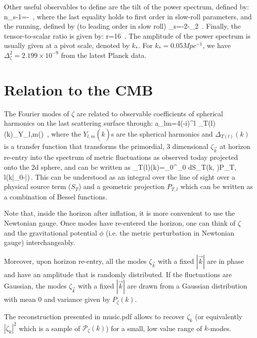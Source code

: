 \documentclass[useAMS,usenatbib,a4paper,onecolumn]{mn2e}
\begin{document}
Other useful observables to define are the tilt of the power spectrum, defined by:
\be
	n_s-1\equiv{}=-\eta\, ,
\ee
where the last equality holds to first order in slow-roll parameters, and the running, defined by (to leading order in slow roll)
\be
	\alpha_s=-2\eta\epsilon-\eta\eta_2\, .
\ee
Finally, the tensor-to-scalar ratio is given by:
\be
	r=16\epsilon\, .
\ee
The amplitude of the power spectrum is usually given at a pivot scale, denoted by $k_*$. For $k_*=0.05Mpc^{-1}$, we have $\Delta^2_\zeta=2.199\times10^{-9}$ from the latest Planck data.



\section{Relation to the CMB}

The Fourier modes of $\zeta$ are related to observable coefficients of spherical harmonics on the last scattering surface through:
\be
	a_{lm}=4\pi (-i)^l\int {} \Delta_{T(l)}(k)\zeta_{}Y_{l,m}()\, ,
\ee
where the  $Y_{l,m}(\hat{k})$s are the spherical harmonics and $\Delta_{T(l)}(k)$ is a transfer function that transforms the primordial, 3 dimensional $\zeta_{\vec{k}}$ at horizon re-entry into the spectrum of metric fluctuations as observed today projected onto the 2d sphere, and can be written as
\be
	\Delta_{T(l)}(k)=\int_0^{\tau_0} d\tau S_T(k, \tau)P_{T, l}(k\left|\tau_0-\tau\right|)\,.
\ee
This can be understood as an integral over the line of sight over a physical source term ($S_T$) and a geometric projection $P_{T,l}$ which can be written as a combination of Bessel functions.

Note that, inside the horizon after inflation, it is more convenient to use the Newtonian gauge. Once modes have re-entered the horizon, one can think of $\zeta$ and the gravitational potential $\phi$ (i.e. the metric perturbation in Newtonian gauge) interchangeably.

Moreover, upon horizon re-entry, all the modes $\zeta_{\vec{k}}$ with a fixed $|\vec{k}|$ are in phase and have an amplitude that is randomly distributed. If the fluctuations are Gaussian, the modes  $\zeta_{\vec{k}}$ with a fixed $|\vec{k}|$ are drawn from a Gaussian distribution with mean 0 and variance given by $P_\zeta(k)$.

The reconstruction presented in music.pdf allows to recover $\zeta_k$ (or equivalently $\left| \zeta_k\right|^2$ which is a sample of $\mathcal{P}_\zeta(k)$) for a small, low value range of $k$-modes.
\end{document}
